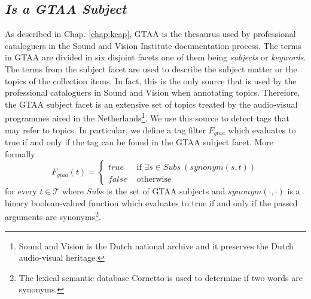 \subsection{\textit{Is a GTAA Subject}}
As described in Chap. \ref{chap:kcap}, GTAA is the thesaurus used by professional cataloguers in the Sound and Vision Institute documentation process. The terms in GTAA  are divided in six disjoint facets one of them being \textit{subjects} or \textit{keywords}. The terms from the subject facet are used to describe the subject matter or the topics of the collection items. In fact, this is the only source that is used by the professional cataloguers in Sound and Vision when annotating topics. Therefore, the GTAA subject facet is an extensive set of topics treated by the audio-visual programmes aired in the Netherlands\footnote{Sound and Vision is the Dutch national archive and it preserves the Dutch audio-visual heritage.}. We use this source to detect tags that may refer to topics. In particular, we define a tag filter $F_{gtaa}$ which evaluates to true if and only if the tag can be found in the GTAA subject facet. More formally
\begin{equation}
F_{gtaa}(t) = \left\{ 
	\begin{array}{rl}
	true &\mbox{ if $\exists s \in Subs~(synonym(s, t))$} \\
	false &\mbox{ otherwise}
	\end{array}
\right.
\end{equation}
for every $t \in \mathcal{T}$ where $Subs$ is the set of GTAA subjects and $synonym(\cdot, \cdot)$ is a binary boolean-valued function which evaluates to true if and only if the passed arguments are synonyms\footnote{The lexical semantic database Cornetto is used to determine if two words are synonyms.}.


